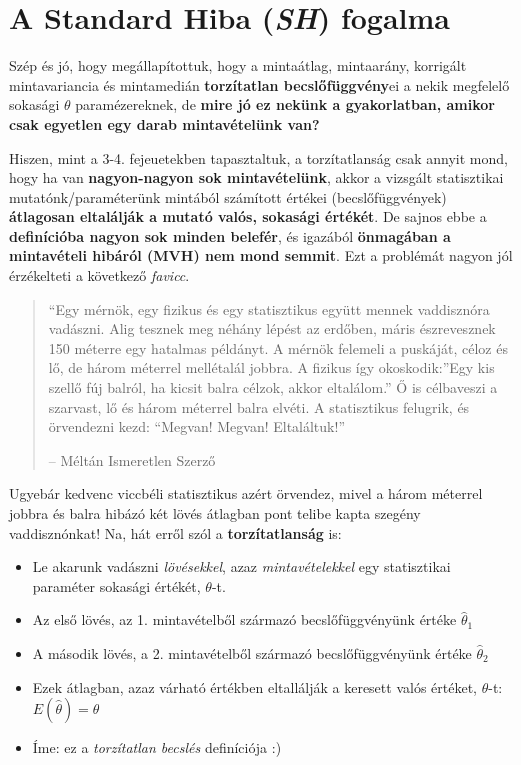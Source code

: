 \documentclass[
]{book}
\providecommand{\tightlist}{%
  \setlength{\itemsep}{0pt}\setlength{\parskip}{0pt}}
\begin{document}
\section{\texorpdfstring{A Standard Hiba (\emph{SH}) fogalma}{A Standard Hiba (SH) fogalma}}\label{a-standard-hiba-sh-fogalma}

Szép és jó, hogy megállapítottuk, hogy a mintaátlag, mintaarány, korrigált mintavariancia és mintamedián \textbf{torzítatlan becslőfüggvény}ei a nekik megfelelő sokasági \(\theta\) paramézereknek, de \textbf{mire jó ez nekünk a gyakorlatban, amikor csak egyetlen egy darab mintavételünk van?}

Hiszen, mint a 3-4. fejeuetekben tapasztaltuk, a torzítatlanság csak annyit mond, hogy ha van \textbf{nagyon-nagyon sok mintavételünk}, akkor a vizsgált statisztikai mutatónk/paraméterünk mintából számított értékei (becslőfüggvények) \textbf{átlagosan eltalálják a mutató valós, sokasági értékét}. De sajnos ebbe a \textbf{definícióba nagyon sok minden belefér}, és igazából \textbf{önmagában a mintavételi hibáról (MVH) nem mond semmit}.
Ezt a problémát nagyon jól érzékelteti a következő \emph{favicc}.

\begin{quote}
``Egy mérnök, egy fizikus és egy statisztikus együtt mennek vaddisznóra vadászni. Alig tesznek meg néhány lépést az erdőben, máris észrevesznek 150 méterre egy hatalmas példányt.
A mérnök felemeli a puskáját, céloz és lő, de három méterrel mellétalál jobbra. A fizikus így okoskodik:''Egy kis szellő fúj balról, ha kicsit balra célzok, akkor eltalálom.''
Ő is célbaveszi a szarvast, lő és három méterrel balra elvéti. A statisztikus felugrik, és örvendezni kezd:
``Megvan! Megvan! Eltaláltuk!''

\hfill -- Méltán Ismeretlen Szerző
\end{quote}

Ugyebár kedvenc viccbéli statisztikus azért örvendez, mivel a három méterrel jobbra és balra hibázó két lövés átlagban pont telibe kapta szegény vaddisznónkat!
Na, hát erről szól a \textbf{torzítatlanság} is:

\begin{itemize}
\tightlist
\item
  Le akarunk vadászni \emph{lövésekkel}, azaz \emph{mintavételekkel} egy statisztikai paraméter sokasági értékét, \(\theta\)-t.
\item
  Az első lövés, az 1. mintavételből származó becslőfüggvényünk értéke \(\hat{\theta}_1\)
\item
  A második lövés, a 2. mintavételből származó becslőfüggvényünk értéke \(\hat{\theta}_2\)
\item
  Ezek átlagban, azaz várható értékben eltallálják a keresett valós értéket, \(\theta\)-t: \(E(\hat{\theta})=\theta\)
\item
  Íme: ez a \emph{torzítatlan becslés} definíciója :)
\end{itemize}
\end{document}
